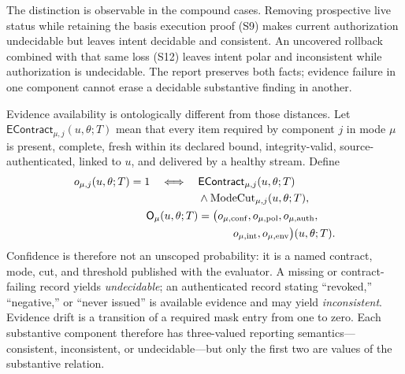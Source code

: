 The distinction is observable in the compound cases. Removing prospective
live status while retaining the basis execution proof (S9) makes current
authorization undecidable but leaves intent decidable and consistent. An
uncovered rollback combined with that same loss (S12) leaves intent polar and
inconsistent while authorization is undecidable. The report preserves both
facts; evidence failure in one component cannot erase a decidable substantive
finding in another.

Evidence availability is ontologically different from those distances. Let
$\mathsf{EContract}_{\mu,j}(u,\theta;T)$ mean that every item required by
component $j$ in mode $\mu$ is present, complete, fresh within its declared
bound, integrity-valid, source-authenticated, linked to $u$, and delivered by
a healthy stream. Define
\[
\begin{aligned}
o_{\mu,j}(u,\theta;T)=1\quad\Longleftrightarrow\quad{}
&\mathsf{EContract}_{\mu,j}(u,\theta;T)\\
&\land\mathrm{ModeCut}_{\mu,j}(u,\theta;T),\\
\mathsf{O}_{\mu}(u,\theta;T)&=
 \bigl(o_{\mu,\mathrm{conf}},o_{\mu,\mathrm{pol}},
 o_{\mu,\mathrm{auth}},\\
&\hspace{3.2em}o_{\mu,\mathrm{int}},o_{\mu,\mathrm{env}}\bigr)(u,\theta;T).
\end{aligned}
\]
Confidence is therefore not an unscoped probability: it is a named contract,
mode, cut, and threshold published with the evaluator. A missing or
contract-failing record yields \emph{undecidable}; an authenticated record
stating ``revoked,'' ``negative,'' or ``never issued'' is available evidence
and may yield \emph{inconsistent}. Evidence drift is a transition of a
required mask entry from one to zero. Each substantive component therefore
has three-valued reporting semantics---consistent, inconsistent, or
undecidable---but only the first two are values of the substantive relation.

